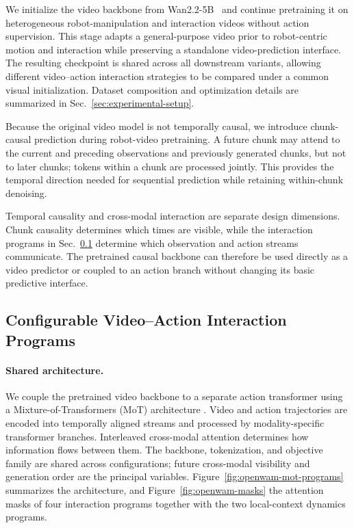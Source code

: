 We initialize the video backbone from Wan2.2-5B~\cite{wan2025wan} and
continue pretraining it on heterogeneous robot-manipulation and interaction
videos without action supervision. This stage adapts a general-purpose video
prior to robot-centric motion and interaction while preserving a standalone
video-prediction interface. The resulting checkpoint is shared across all
downstream \ours variants, allowing different video--action interaction
strategies to be compared under a common visual initialization. Dataset
composition and optimization details are summarized in
Sec.~\ref{sec:experimental-setup}.

Because the original video model is not temporally causal, we introduce
chunk-causal prediction during robot-video pretraining. A future chunk may
attend to the current and preceding observations and previously generated
chunks, but not to later chunks; tokens within a chunk are processed
jointly. This provides the temporal direction needed for sequential
prediction while retaining within-chunk denoising.

Temporal causality and cross-modal interaction are separate design
dimensions. Chunk causality determines which times are visible, while the
interaction programs in Sec.~\ref{sec:interaction-programs} determine which
observation and action streams communicate. The pretrained causal backbone
can therefore be used directly as a video predictor or coupled to an action
branch without changing its basic predictive interface.


\subsection{Configurable Video--Action Interaction Programs}
\label{sec:interaction-programs}
\label{sec:framework-architecture}

\paragraph{Shared architecture.}
We couple the pretrained video backbone to a separate action
transformer using a Mixture-of-Transformers (MoT) architecture \cite{liang2024mixture}. Video and
action trajectories are encoded into temporally aligned streams and
processed by modality-specific transformer branches. Interleaved
cross-modal attention determines how information flows between them. The
backbone, tokenization, and objective family are shared across
configurations; future cross-modal visibility and generation order are the
principal variables. Figure~\ref{fig:openwam-mot-programs} summarizes the
architecture, and Figure~\ref{fig:openwam-masks} the attention masks of four
interaction programs together with the two local-context dynamics programs.

